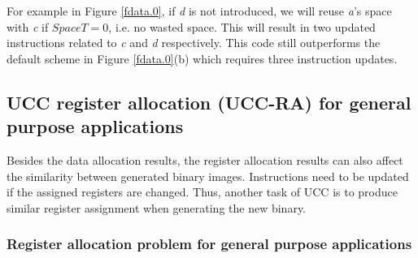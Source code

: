 For example in Figure \ref{fdata.0}, if {\it d} is not introduced, we
will reuse {\it a}'s space with {\it c} if $SpaceT=0$, i.e. no wasted
space. This will result in two updated instructions related to
 {\it c} and {\it d} respectively. This code still outperforms
the default scheme in Figure \ref{fdata.0}(b) which requires three
instruction updates.



\subsection{UCC register allocation (UCC-RA) for general purpose applications}
Besides the data allocation results, the register allocation results can also 
affect the similarity between generated binary images.
Instructions need to be updated if the assigned registers are changed.
Thus, another task of UCC is to produce similar register assignment
when generating the new binary.

\subsubsection{Register allocation problem for general purpose applications} 
%

